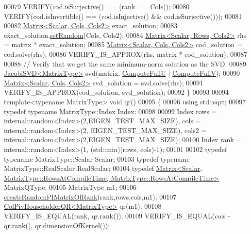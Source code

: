 \begin{DoxyCode}
00079   VERIFY(cod.isSurjective() == (rank == Cols));
00080   VERIFY(cod.isInvertible() == (cod.isInjective() && cod.isSurjective()));
00081 
00082   \hyperlink{group___core___module_class_eigen_1_1_matrix}{Matrix<Scalar, Cols, Cols2>} exact\_solution;
00083   exact\_solution.\hyperlink{class_eigen_1_1_plain_object_base_af0e576a0e1aefc9ee346de44cc352ba3}{setRandom}(Cols, Cols2);
00084   \hyperlink{group___core___module_class_eigen_1_1_matrix}{Matrix<Scalar, Rows, Cols2>} rhs = matrix * exact\_solution;
00085   \hyperlink{group___core___module_class_eigen_1_1_matrix}{Matrix<Scalar, Cols, Cols2>} cod\_solution = cod.solve(rhs);
00086   VERIFY\_IS\_APPROX(rhs, matrix * cod\_solution);
00087 
00088   \textcolor{comment}{// Verify that we get the same minimum-norm solution as the SVD.}
00089   \hyperlink{group___s_v_d___module_class_eigen_1_1_jacobi_s_v_d}{JacobiSVD<MatrixType>} svd(matrix, \hyperlink{group__enums_ggae3e239fb70022eb8747994cf5d68b4a9a2b4f91ca5859a4159dbfe8090043817f}{ComputeFullU} | 
      \hyperlink{group__enums_ggae3e239fb70022eb8747994cf5d68b4a9a52c6f7e80bbf9a42297c88f700245b51}{ComputeFullV});
00090   \hyperlink{group___core___module_class_eigen_1_1_matrix}{Matrix<Scalar, Cols, Cols2>} svd\_solution = svd.solve(rhs);
00091   VERIFY\_IS\_APPROX(cod\_solution, svd\_solution);
00092 \}
00093 
00094 \textcolor{keyword}{template}<\textcolor{keyword}{typename} MatrixType> \textcolor{keywordtype}{void} qr()
00095 \{
00096   \textcolor{keyword}{using} std::sqrt;
00097   \textcolor{keyword}{typedef} \textcolor{keyword}{typename} MatrixType::Index Index;
00098 
00099   Index rows = internal::random<Index>(2,EIGEN\_TEST\_MAX\_SIZE), cols = internal::random<Index>(2,
      EIGEN\_TEST\_MAX\_SIZE), cols2 = internal::random<Index>(2,EIGEN\_TEST\_MAX\_SIZE);
00100   Index rank = internal::random<Index>(1, (std::min)(rows, cols)-1);
00101 
00102   \textcolor{keyword}{typedef} \textcolor{keyword}{typename} MatrixType::Scalar Scalar;
00103   \textcolor{keyword}{typedef} \textcolor{keyword}{typename} MatrixType::RealScalar RealScalar;
00104   \textcolor{keyword}{typedef} 
      \hyperlink{group___core___module_class_eigen_1_1_matrix}{Matrix<Scalar, MatrixType::RowsAtCompileTime, MatrixType::RowsAtCompileTime>}
       MatrixQType;
00105   MatrixType m1;
00106   \hyperlink{namespace_eigen_a0d9a7ddcee5c7c8defaba3628455efb2}{createRandomPIMatrixOfRank}(rank,rows,cols,m1);
00107   \hyperlink{group___q_r___module}{ColPivHouseholderQR<MatrixType>} qr(m1);
00108   VERIFY\_IS\_EQUAL(rank, qr.rank());
00109   VERIFY\_IS\_EQUAL(cols - qr.rank(), qr.dimensionOfKernel());

\end{DoxyCode}
